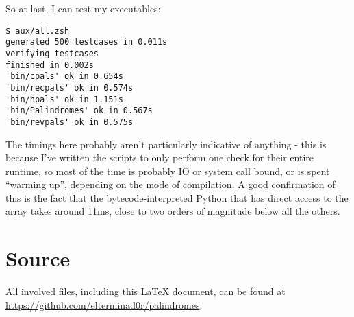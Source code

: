 \documentclass[fleqn,a4paper,11pt]{article}
\begin{document}
    So at last, I can test my executables:

\begin{lstlisting}[caption=Actual testing]
$ aux/all.zsh
generated 500 testcases in 0.011s
verifying testcases
finished in 0.002s
'bin/cpals' ok in 0.654s
'bin/recpals' ok in 0.574s
'bin/hpals' ok in 1.151s
'bin/Palindromes' ok in 0.567s
'bin/revpals' ok in 0.575s
\end{lstlisting}
\iffalse $ \fi %

    The timings here probably aren't particularly indicative of anything - this
    is because I've written the scripts to only perform one check for their
    entire runtime, so most of the time is probably IO or system call bound, or
    is spent ``warming up'', depending on the mode of compilation. A good
    confirmation of this is the fact that the bytecode-interpreted Python that
    has direct access to the array takes around 11ms, close to two orders of
    magnitude below all the others.

    \section{Source}

    All involved files, including this \LaTeX{} document, can be found at
    \url{https://github.com/elterminad0r/palindromes}.
\end{document}
